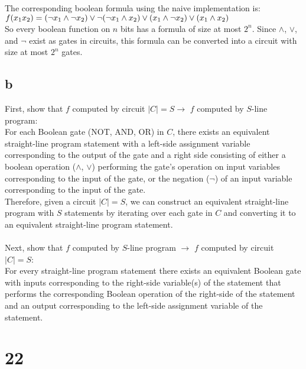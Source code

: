 \documentclass[letterpaper,notitlepage,twoside]{article}
\begin{document}
The corresponding boolean formula using the naive implementation is:
$f(x_1x_2) = (\neg x_1 \land \neg x_2) \lor \\
\neg(\neg x_1 \land x_2) \lor \\
(x_1 \land \neg x_2) \lor \\
(x_1 \land x_2)$ \\

So every boolean function on $n$ bits has a formula of size at most $2^n$.
Since $\land$, $\lor$, and $\neg$ exist as gates in circuits, this formula can be converted into a circuit with size at most $2^n$ gates.

\subsection*{b}
First, show that $f$ computed by circuit $|C| = S \rightarrow$ $f$ computed by $S$-line program: \\
For each Boolean gate (NOT, AND, OR) in $C$, there exists an equivalent straight-line program statement with a left-side assignment variable corresponding to the output of the gate and a right side consisting of either a boolean operation ($\land$, $\lor$) performing the gate's operation on input variables corresponding to the input of the gate, or the negation ($\neg$) of an input variable corresponding to the input of the gate. \\
Therefore, given a circuit $|C| = S$, we can construct an equivalent straight-line program with $S$ statements by iterating over each gate in $C$ and converting it to an equivalent straight-line program statement. \\ \\
Next, show that $f$ computed by $S$-line program $\rightarrow$ $f$ computed by circuit $|C| = S$: \\
For every straight-line program statement there exists an equivalent Boolean gate with inputs corresponding to the right-side variable(s) of the statement that performs the corresponding Boolean operation of the right-side of the statement and an output corresponding to the left-side assignment variable of the statement.

\section*{22}
\end{document}
